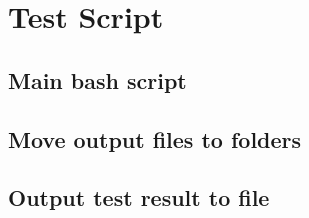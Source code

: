 \documentclass[a4paper,12pt,openright,twoside]{book} %
\title{\titleinfo}
\author{\authorinfo}
\date{\monthname~\the\year}
\begin{document}
\frontmatter
\maketitle

	

\tableofcontents



\mainmatter







\appendix

\chapter{Test Script}
\label{app:test_script}

\section{Main bash script}


\clearpage
\section{Move output files to folders}


\clearpage
\section{Output test result to file}


\end{document}
